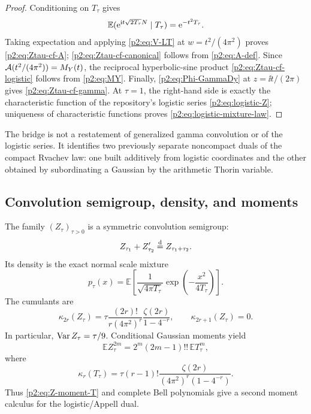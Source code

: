 \documentclass[11pt]{article}
\theoremstyle{definition}
\theoremstyle{remark}
\newcommand{\E}{\mathbb E}
\begin{document}
\begin{proof}
Conditioning on $T_\tau$ gives
\[
 \E(\e^{\ii t\sqrt{2T_\tau}N}\mid T_\tau)=\e^{-t^2T_\tau}.
\]
Taking expectation and applying \eqref{p2:eq:V-LT} at
$w=t^2/(4\pi^2)$ proves \eqref{p2:eq:Ztau-cf-A};
\eqref{p2:eq:Ztau-cf-canonical} follows from \eqref{p2:eq:A-def}.  Since
$\mathcal A(t^2/(4\pi^2))=M_Y(t)$, the reciprocal hyperbolic-sine product
\eqref{p2:eq:Ztau-cf-logistic} follows from \eqref{p2:eq:MY}.  Finally,
\eqref{p2:eq:Phi-GammaDy} at $z=\ii t/(2\pi)$ gives
\eqref{p2:eq:Ztau-cf-gamma}.  At $\tau=1$, the right-hand side is exactly the characteristic
function of the repository's logistic series \eqref{p2:eq:logistic-Z}; uniqueness of
characteristic functions proves \eqref{p2:eq:logistic-mixture-law}.
\end{proof}

\begin{resultbox}
The bridge is not a restatement of generalized gamma convolution or of the logistic series.
It identifies two previously separate noncompact duals of the compact Rvachev law: one built
additively from logistic coordinates and the other obtained by subordinating a Gaussian by
the arithmetic Thorin variable.
\end{resultbox}

\subsection{Convolution semigroup, density, and moments}

The family $(Z_\tau)_{\tau>0}$ is a symmetric convolution semigroup:
\begin{equation}
 Z_{\tau_1}+Z'_{\tau_2}\mathrel{\stackrel{\mathrm d}=} Z_{\tau_1+\tau_2}.           \label{p2:eq:Z-semigroup}
\end{equation}
Its density is the exact normal scale mixture
\begin{equation}
 \boxed{\quad
 p_\tau(x)=\E\left[
 \frac{1}{\sqrt{4\pi T_\tau}}
 \exp\left(-\frac{x^2}{4T_\tau}\right)
 \right].
 \quad}                                                  \label{p2:eq:Z-density-mixture}
\end{equation}
The cumulants are
\begin{equation}
 \kappa_{2r}(Z_\tau)
 =\tau\frac{(2r)!}{r(4\pi^2)^r}
 \frac{\zeta(2r)}{1-4^{-r}},
 \qquad \kappa_{2r+1}(Z_\tau)=0.                        \label{p2:eq:Z-cumulants}
\end{equation}
In particular, $\operatorname{Var} Z_\tau=\tau/9$.  Conditional Gaussian moments yield
\begin{equation}
 \E Z_\tau^{2m}=2^m(2m-1)!!\,\E T_\tau^m,               \label{p2:eq:Z-moment-T}
\end{equation}
where
\begin{equation}
 \kappa_r(T_\tau)=
 \tau(r-1)!\frac{\zeta(2r)}{(4\pi^2)^r(1-4^{-r})}.       \label{p2:eq:T-cumulants}
\end{equation}
Thus \eqref{p2:eq:Z-moment-T} and complete Bell polynomials give a second moment calculus for
the logistic/Appell dual.
\end{document}
